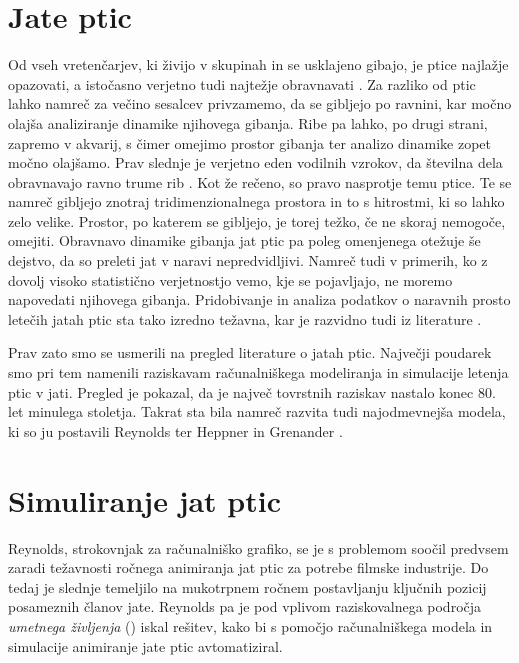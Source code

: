 \begin{razsirjeniPovzetek}
\section{Jate ptic}
Od vseh vretenčarjev, ki živijo v skupinah in se usklajeno gibajo, je ptice najlažje opazovati, a istočasno verjetno tudi najtežje obravnavati \cite{heppner:1997}. Za razliko od ptic lahko namreč za večino sesalcev privzamemo, da se gibljejo po ravnini, kar močno olajša analiziranje dinamike njihovega gibanja. Ribe pa lahko, po drugi strani, zapremo v akvarij, s čimer omejimo prostor gibanja ter analizo dinamike zopet močno olajšamo. Prav slednje je verjetno eden vodilnih vzrokov, da številna dela obravnavajo ravno trume rib \cite{aoki:1982,dill:1997,mcfarland:1997,partridge:1982,shaw:1962,terzopoulos:1994,tu:1994,tu:1999,ward:2001,zaera:1996}. Kot že rečeno, so pravo nasprotje temu ptice. Te se namreč gibljejo znotraj tridimenzionalnega prostora in to s hitrostmi, ki so lahko zelo velike. Prostor, po katerem se gibljejo, je torej težko, če ne skoraj nemogoče, omejiti. Obravnavo dinamike gibanja jat ptic pa poleg omenjenega otežuje še dejstvo, da so preleti jat v naravi nepredvidljivi. Namreč tudi v primerih, ko z dovolj visoko statistično verjetnostjo vemo, kje se pojavljajo, ne moremo napovedati njihovega gibanja. Pridobivanje in analiza podatkov o naravnih prosto letečih jatah ptic sta tako izredno težavna, kar je razvidno tudi iz literature \cite{gould:1974,heppner:1997,jaffe:1997,moyle:1998}.

Prav zato smo se usmerili na pregled literature o jatah ptic. Največji poudarek smo pri tem namenili raziskavam računalniškega modeliranja in simulacije letenja ptic v jati. Pregled je pokazal, da je največ tovrstnih raziskav nastalo konec 80. let minulega stoletja. Takrat sta bila namreč razvita tudi najodmevnejša modela, ki so ju postavili Reynolds \cite{reynolds:1987} ter Heppner in Grenander \cite{heppner:1990}.

\section{Simuliranje jat ptic}
Reynolds, strokovnjak za računalniško grafiko, se je s problemom soočil predvsem zaradi težavnosti ročnega animiranja jat ptic za potrebe filmske industrije. Do tedaj je slednje temeljilo na mukotrpnem ročnem postavljanju ključnih pozicij posameznih članov jate. Reynolds pa je pod vplivom raziskovalnega področja \emph{umetnega življenja} () iskal rešitev, kako bi s pomočjo računalniškega modela in simulacije animiranje jate ptic avtomatiziral.


\end{razsirjeniPovzetek}
